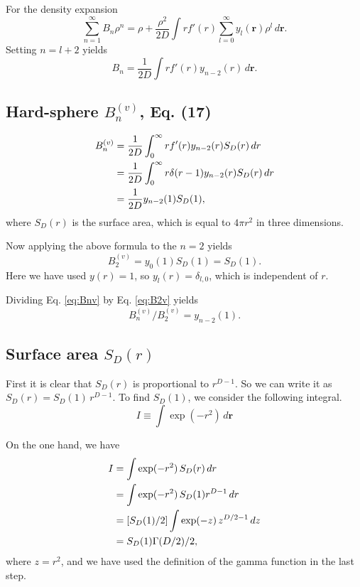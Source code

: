 \documentclass[aip,jcp,reprint,superscriptaddress]{revtex4-1}
\numberwithin{equation}{subsection}
\newcommand{\vct}[1]{\mathbf{#1}}
\providecommand{\vr}{} %
\renewcommand{\vr}{\vct{r}}
\begin{document}
For the density expansion
\[
  \sum_{n = 1}^\infty B_n \rho^n
= \rho
+
\frac{ \rho^2 }{ 2 D }
\int r f'(r)
    \sum_{l = 0}^\infty y_l(\vr) \rho^l \, d\vr.
\]
%
Setting $n = l + 2$ yields
\[
B_n = \frac{1}{2D} \int r f'(r) y_{n-2}(r) \, d\vr.
\]



\subsection{Hard-sphere $B_n^{(v)}$, Eq. (17)}

\begin{align}
  B_n^{(v)}
&=
  \frac{1}{2D}
    \int_0^\infty r f'(r) y_{n-2}(r) S_D(r) \, dr
    \notag \\
&=
  \frac{1}{2D}
    \int_0^\infty r \delta(r - 1) y_{n-2}(r) S_D(r) \, dr
    \notag \\
&= \frac{1}{2D}
    y_{n-2}(1) S_D(1),
    \label{eq:Bnv}
\end{align}
%
where $S_D(r)$ is the surface area,
which is equal to $4\pi r^2$ in three dimensions.

Now applying the above formula to the $n = 2$ yields
\begin{equation}
B_2^{(v)}
=
y_0(1) S_D(1) = S_D(1).
\label{eq:B2v}
\end{equation}
Here we have used $y(r) = 1$, so $y_l(r) = \delta_{l, 0}$,
  which is independent of $r$.

Dividing Eq. \eqref{eq:Bnv} by Eq. \eqref{eq:B2v} yields
\[
  B_n^{(v)} / B_2^{(v)} = y_{n-2}(1).
\]



\subsection{Surface area $S_D(r)$}

First it is clear that $S_D(r)$ is proportional to $r^{D-1}$.
So we can write it as $S_D(r) = S_D(1) \, r^{D-1}$.
To find $S_D(1)$, we consider the following integral.
\[
I
\equiv
\int \exp(-r^2) \, d\vr
\]

On the one hand, we have
\begin{align}
I
&=
\int \exp(-r^2) \, S_D(r) \, d r
\notag \\
&=
\int \exp(-r^2) \, S_D(1) r^{D-1} \, dr
\notag \\
&=
[S_D(1)/2]
\int \exp(-z) \, z^{D/2 - 1} \, dz
\notag \\
&=
S_D(1) \Gamma(D/2)/2,
\label{eq:gaussintsphere}
\end{align}
%
where $z = r^2$,
and we have used the definition of the gamma function in the last step.
\end{document}
